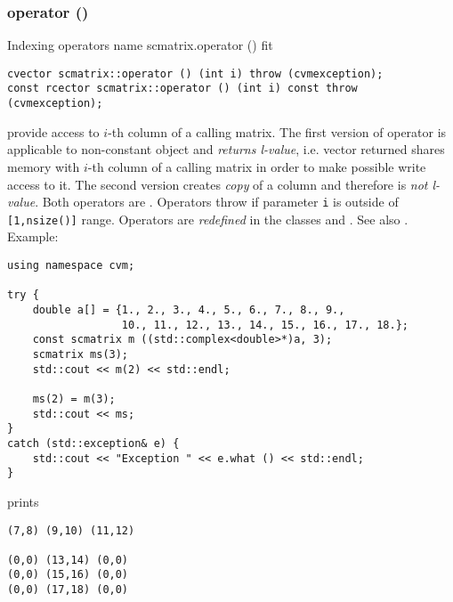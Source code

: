 \subsubsection{operator ()}
Indexing operators%
\pdfdest name {scmatrix.operator ()} fit
\begin{verbatim}
cvector scmatrix::operator () (int i) throw (cvmexception);
const rcector scmatrix::operator () (int i) const throw (cvmexception);
\end{verbatim}
provide access to \hbox{$i$-th} column of a calling matrix. The first version
of  operator is applicable to  non-constant object and
\emph{returns  l-value}, i.e.  vector returned shares  memory
with  \hbox{$i$-th} column of a calling matrix
in order to make possible write access to it.
The second version creates  \emph{copy} of a column and therefore is
\emph{not  l-value}.
Both operators are \Based.
Operators throw 
if  parameter \verb"i" is outside of \verb"[1,nsize()]" range.
Operators are \emph{redefined}
in the classes 
and .
See also .
Example:
\begin{Verbatim}
using namespace cvm;

try {
    double a[] = {1., 2., 3., 4., 5., 6., 7., 8., 9.,
                  10., 11., 12., 13., 14., 15., 16., 17., 18.};
    const scmatrix m ((std::complex<double>*)a, 3);
    scmatrix ms(3);
    std::cout << m(2) << std::endl;

    ms(2) = m(3);
    std::cout << ms;
}
catch (std::exception& e) {
    std::cout << "Exception " << e.what () << std::endl;
}
\end{Verbatim}
prints
\begin{Verbatim}
(7,8) (9,10) (11,12)

(0,0) (13,14) (0,0)
(0,0) (15,16) (0,0)
(0,0) (17,18) (0,0)
\end{Verbatim}
\newpage





